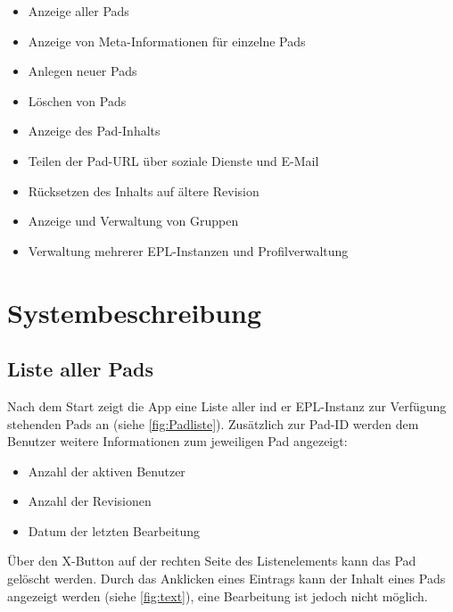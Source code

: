 \begin{itemize}
	\item Anzeige aller Pads
	\item Anzeige von Meta-Informationen für einzelne Pads
	\item Anlegen neuer Pads
	\item Löschen von Pads
	\item Anzeige des Pad-Inhalts
	\item Teilen der Pad-URL über soziale Dienste und E-Mail
	\item Rücksetzen des Inhalts auf ältere Revision
	\item Anzeige und Verwaltung von Gruppen
	\item Verwaltung mehrerer EPL-Instanzen und Profilverwaltung
\end{itemize}


\section{Systembeschreibung}
\subsection{Liste aller Pads}
Nach dem Start zeigt die App eine Liste aller ind er EPL-Instanz zur Verfügung stehenden Pads an (siehe \autoref{fig:Padliste}).
Zusätzlich zur Pad-ID werden dem Benutzer weitere Informationen zum jeweiligen Pad angezeigt:

\begin{itemize}
	\item Anzahl der aktiven Benutzer
	\item Anzahl der Revisionen
	\item Datum der letzten Bearbeitung
\end{itemize}

Über den X-Button auf der rechten Seite des Listenelements kann das Pad gelöscht werden.
Durch das Anklicken eines Eintrags kann der Inhalt eines Pads angezeigt werden (siehe \autoref{fig:text}), eine Bearbeitung ist jedoch nicht möglich.

